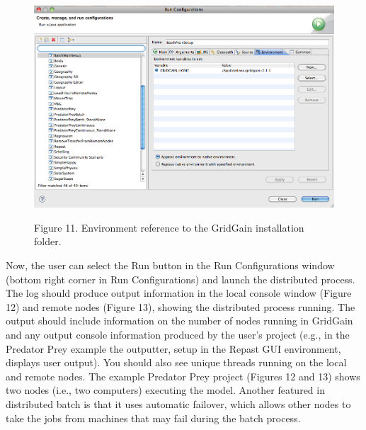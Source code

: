\documentclass[12pt]{article}
\begin{document}
\begin{figure}[!t]
\begin{center}
\includegraphics [width=\textwidth]{images/Figure11.jpg}
\label{cablehealth}
\begin{minipage}{.9\textwidth}Figure 11. Environment reference to the
  GridGain installation folder.
\end{minipage}
\end{center}
\end{figure}

Now, the user can select the Run button in the Run Configurations
window (bottom right corner in Run Configurations) and launch the distributed process. The
log should produce output information in the local console window
(Figure 12) and remote nodes (Figure 13), showing the distributed
process running. The output should include information on the number
of nodes running in GridGain and any output console information
produced by the user's project (e.g., in the Predator Prey example the
outputter, setup in the Repast GUI environment, displays user
output). You should also see unique threads running on the local and
remote nodes. The example Predator Prey project (Figures 12 and 13)
shows two nodes (i.e., two computers) executing the model. Another featured in
distributed batch is that it uses automatic failover, which allows
other nodes to take the jobs from machines that may fail during the
batch process. 
\end{document}
